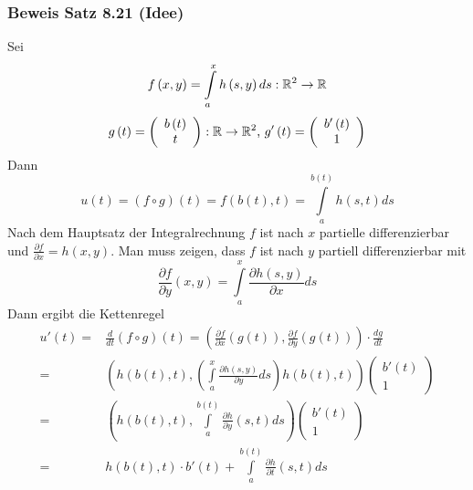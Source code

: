 \subsubsection*{Beweis Satz 8.21 (Idee)}
Sei \[f\left( {x,y} \right) = \int\limits_a^x {h\left( {s,y} \right)ds}:\mathbb{R}^2\to\mathbb{R} \]
\[g\left( t \right) = \left( {\begin{array}{*{20}{c}}
{b\left( t \right)}\\
t
\end{array}} \right):\R\to\R^2\text{, }g'\left( t \right) = \left( {\begin{array}{*{20}{c}}
{b'\left( t \right)}\\
1
\end{array}} \right)\]
Dann \[u(t) = \left( {f \circ g} \right)(t) = f\left( {b(t),t} \right) = \int\limits_a^{b(t)} {h(s,t)ds} \]
Nach dem Hauptsatz der Integralrechnung $f$ ist nach $x$ partielle differenzierbar und $\frac{\partial f}{\partial x}=h(x,y)$. Man muss zeigen, dass $f$ ist nach $y$ partiell differenzierbar mit \[\frac{{\partial f}}{{\partial y}}(x,y) = \int\limits_a^x {\frac{{\partial h(s,y)}}{{\partial x}}ds} \]
Dann ergibt die Kettenregel
\begin{align*}
u'(t) = &\frac{d}{{dt}}\left( {f \circ g} \right)(t) = \left( {\frac{{\partial f}}{{\partial x}}\left( {g(t)} \right),\frac{{\partial f}}{{\partial y}}\left( {g(t)} \right)} \right) \cdot \frac{{dg}}{{dt}}\\
= &\left( {h\left( {b(t),t} \right),\left( {\int\limits_a^x {\frac{{\partial h(s,y)}}{{\partial y}}ds} } \right)h\left( {b(t),t} \right)} \right)\left( {\begin{array}{*{20}{c}}
{b'(t)}\\
1
\end{array}} \right)\\
= &\left( {h\left( {b(t),t} \right),\int\limits_a^{b(t)} {\frac{{\partial h}}{{\partial y}}(s,t)ds} } \right)\left( {\begin{array}{*{20}{c}}
{b'(t)}\\
1
\end{array}} \right)\\
= & h\left( {b(t),t} \right) \cdot b'(t) + \int\limits_a^{b(t)} {\frac{{\partial h}}{{\partial t}}(s,t)ds}
\end{align*}
